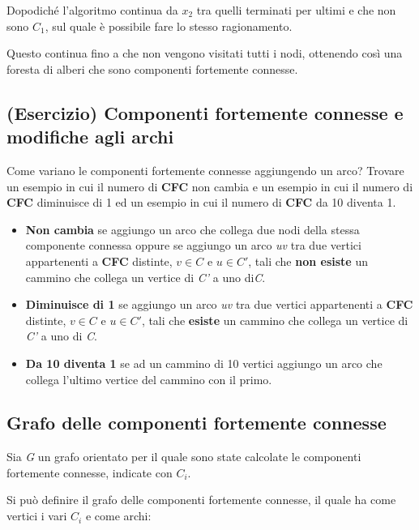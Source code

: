 Dopodiché l'algoritmo continua da $x_2$ tra quelli terminati per
ultimi e che non sono $C_1$, sul quale è possibile fare lo
stesso ragionamento.

Questo continua fino a che non vengono visitati tutti i nodi, ottenendo
così una foresta di alberi che sono componenti fortemente connesse.

\subsection{(Esercizio) Componenti fortemente connesse e modifiche agli archi}\label{esericizio-componenti-fortemente-connesse-e-modifiche-agli-archi}

Come variano le componenti fortemente connesse aggiungendo un arco?
Trovare un esempio in cui il numero di \textbf{CFC} non cambia e un
esempio in cui il numero di \textbf{CFC} diminuisce di 1 ed un esempio
in cui il numero di \textbf{CFC} da 10 diventa 1.

\begin{itemize}
	\item \textbf{Non cambia} se aggiungo un arco che collega due nodi della stessa componente connessa oppure se aggiungo un arco \textit{uv} tra due vertici appartenenti a \textbf{CFC} distinte, $ v \in C $ e $ u \in C' $, tali che \textbf{non esiste} un cammino che collega un vertice di \textit{C'} a  uno di\textit{C}.
	\item \textbf{Diminuisce di 1} se aggiungo un arco \textit{uv} tra due vertici appartenenti a \textbf{CFC} distinte, $ v \in C $ e $ u \in C' $, tali che \textbf{esiste} un cammino che collega un vertice di \textit{C'} a uno di \textit{C}.
	\item \textbf{Da 10 diventa 1} se ad un cammino di 10 vertici aggiungo un arco che collega l'ultimo vertice del cammino con il primo.
\end{itemize}

\subsection{Grafo delle componenti fortemente connesse}\label{grafo-delle-componenti-fortemente-connesse}

Sia \emph{G} un grafo orientato per il quale sono state calcolate le
componenti fortemente connesse, indicate con $C_i$.

Si può definire il grafo delle componenti fortemente connesse, il quale ha come vertici i vari $C_i$ e come archi:

